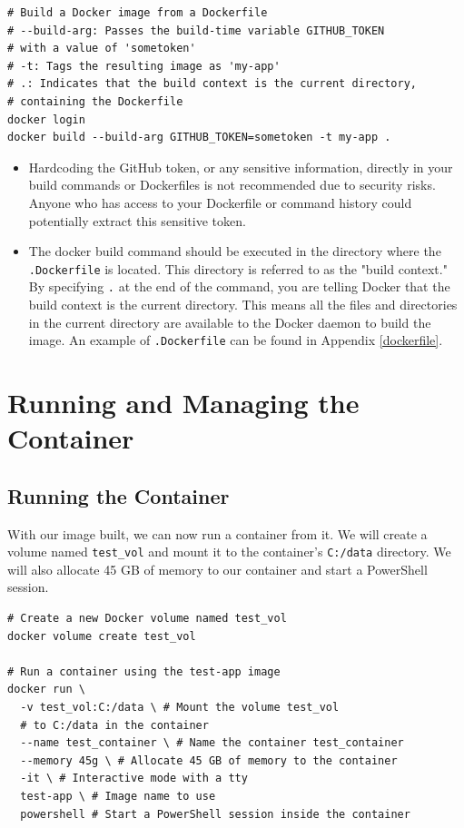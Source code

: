 \documentclass{article}
\begin{document}
\begin{lstlisting}
# Build a Docker image from a Dockerfile
# --build-arg: Passes the build-time variable GITHUB_TOKEN 
# with a value of 'sometoken'
# -t: Tags the resulting image as 'my-app'
# .: Indicates that the build context is the current directory,
# containing the Dockerfile
docker login
docker build --build-arg GITHUB_TOKEN=sometoken -t my-app .
\end{lstlisting}

\begin{itemize}
\item Hardcoding the GitHub token, or any sensitive information, directly in your build commands or Dockerfiles is not recommended due to security risks. Anyone who has access to your Dockerfile or command history could potentially extract this sensitive token. 
\item The docker build command should be executed in the directory where the \texttt{.Dockerfile} is located. This directory is referred to as the "build context." By specifying \texttt{.} at the end of the command, you are telling Docker that the build context is the current directory. This means all the files and directories in the current directory are available to the Docker daemon to build the image. An example of \texttt{.Dockerfile} can be found in Appendix \ref{dockerfile}.
\end{itemize}


\section{Running and Managing the Container}

\subsection{Running the Container}
With our image built, we can now run a container from it. We will create a volume named \texttt{test\_vol} and mount it to the container's \texttt{C:/data} directory. We will also allocate 45 GB of memory to our container and start a PowerShell session.

\begin{lstlisting}
# Create a new Docker volume named test_vol
docker volume create test_vol

# Run a container using the test-app image
docker run \
  -v test_vol:C:/data \ # Mount the volume test_vol 
  # to C:/data in the container
  --name test_container \ # Name the container test_container
  --memory 45g \ # Allocate 45 GB of memory to the container
  -it \ # Interactive mode with a tty
  test-app \ # Image name to use
  powershell # Start a PowerShell session inside the container
\end{lstlisting}
\end{document}
